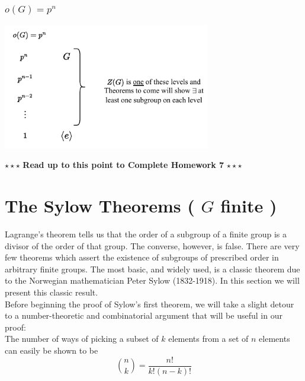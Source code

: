 \subsubsection*{$o(G)=p^n$}
\begin{center}
    \includegraphics[width=0.68\textwidth]{Figures/prime_power_order_lattice.pdf}
\end{center}
\begin{tcolorbox}
    \begin{center}
        $\star\star\star$ \textbf{Read up to this point to Complete Homework 7} $\star\star\star$
    \end{center}
\end{tcolorbox}

\section{\texorpdfstring{The Sylow Theorems ( $G$ finite )}{The Sylow Theorems ( G finite )}}
Lagrange's theorem tells us that the order of a subgroup of a finite group is a divisor of the order of that group. The converse, however, is false. There are very few theorems which assert the existence of subgroups of prescribed order in arbitrary finite groups. The most basic, and widely used, is a classic theorem due to the Norwegian mathematician Peter Sylow (1832-1918).
In this section we will present this classic result. \\

\noindent Before beginning the proof of Sylow's first theorem, we will take a slight detour to a number-theoretic and combinatorial argument that will be useful in our proof: \\
The number of ways of picking a subset of $k$ elements from a set of $n$ elements can easily be shown to be 
\begin{equation}
    {n \choose k} = {\frac{n!}{k!(n-k)!}} \nonumber
\end{equation}


